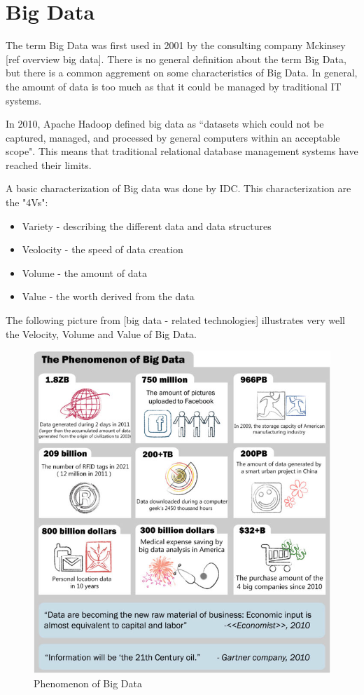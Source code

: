 \documentclass{acm_proc_article-sp}
\begin{document}
\section{Big Data}

The term Big Data was first used in 2001 by the consulting company Mckinsey [ref overview big data]. There is no general definition about the term Big Data, but there is a common aggrement on some characteristics of Big Data. In general, the amount of data is too much as that it could be managed by traditional IT systems.

In 2010, Apache Hadoop defined big data as “datasets which could not be
captured, managed, and processed by general computers within an acceptable
scope". This means that traditional relational database management systems have reached their limits.

A basic characterization of Big data was done by IDC. This characterization are the "4Vs":

\begin{itemize}
	\item Variety - describing the different data and data structures
	\item Veolocity - the speed of data creation
	\item Volume - the amount of data
	\item Value - the worth derived from the data
\end{itemize}

The following picture from [big data - related technologies] illustrates very well the Velocity, Volume and Value of Big Data.

\begin{figure}[hbtp]
	\centering
	\includegraphics[scale=0.5]{big_data.png}
	\caption{Phenomenon of Big Data}
\end{figure}
\end{document}
